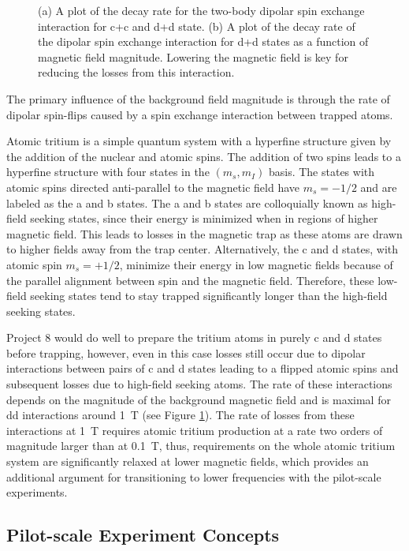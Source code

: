 \begin{figure}[htbp]
\begin{subfigure}{0.49\textwidth}
        \caption{}
    \end{subfigure}
    \caption{(a) A plot of the decay rate for the two-body dipolar spin exchange interaction for c+c and d+d state. (b) A plot of the decay rate of the dipolar spin exchange interaction for d+d states as a function of magnetic field magnitude. Lowering the magnetic field is key for reducing the losses from this interaction.}
    \label{fig:chap3-dipolarloss}
 \end{figure}
 The primary influence of the background field magnitude is through the rate of dipolar spin-flips caused by a spin exchange interaction between trapped atoms. 
 
 Atomic tritium is a simple quantum system with a hyperfine structure given by the addition of the nuclear and atomic spins. The addition of two spins leads to a hyperfine structure with four states in the $(m_s,m_I)$ basis. The states with atomic spins directed anti-parallel to the magnetic field have $m_s=-1/2$ and are labeled as the a and b states. The a and b states are colloquially known as high-field seeking states, since their energy is minimized when in regions of higher magnetic field. This leads to losses in the magnetic trap as these atoms are drawn to higher fields away from the trap center. Alternatively, the c and d states, with atomic spin $m_s=+1/2$, minimize their energy in low magnetic fields because of the parallel alignment between spin and the magnetic field. Therefore, these low-field seeking states tend to stay trapped significantly longer than the high-field seeking states.

 Project 8 would do well to prepare the tritium atoms in purely c and d states before trapping, however, even in this case losses still occur due to dipolar interactions between pairs of c and d states leading to a flipped atomic spins and subsequent losses due to high-field seeking atoms. The rate of these interactions depends on the magnitude of the background magnetic field and is maximal for dd interactions around 1~T (see Figure \ref{fig:chap3-dipolarloss}). The rate of losses from these interactions at 1~T requires atomic tritium production at a rate two orders of magnitude larger than at 0.1~T, thus, requirements on the whole atomic tritium system are significantly relaxed at lower magnetic fields, which provides an additional argument for transitioning to lower frequencies with the pilot-scale experiments.

\subsection{Pilot-scale Experiment Concepts}

